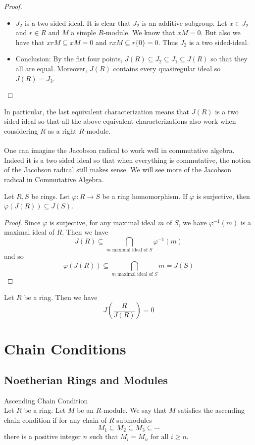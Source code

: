 \documentclass[a4paper]{article}
\begin{document}
\begin{thm}{}{}
\begin{proof}
\begin{itemize}
\item $J_2$ is a two sided ideal. It is clear that $J_2$ is an additive subgroup. Let $x\in J_2$ and $r\in R$ and $M$ a simple $R$-module. We know that $xM=0$. But also we have that $xrM\subseteq xM=0$ and $rxM\subseteq r\{0\}=0$. Thus $J_2$ is a two sided-ideal. 

\item Conclusion: By the fist four points, $J(R)\subseteq J_2\subseteq J_1\subseteq J(R)$ so that they all are equal. Moreover, $J(R)$ contains every quasiregular ideal so $J(R)=J_3$. 
\end{itemize}
\end{proof}
\end{thm}

In particular, the last equivalent characterization means that $J(R)$ is a two sided ideal so that all the above equivalent characterizations also work when considering $R$ as a right $R$-module. \\~\\

One can imagine the Jacobson radical to work well in commutative algebra. Indeed it is a two sided ideal so that when everything is commutative, the notion of the Jacobson radical still makes sense. We will see more of the Jacobson radical in Commutative Algebra. 

\begin{lmm}{}{} Let $R,S$ be rings. Let $\varphi:R\to S$ be a ring homomorphism. If $\varphi$ is surjective, then $\varphi(J(R))\subseteq J(S)$. 
\begin{proof}
Since $\varphi$ is surjective, for any maximal ideal $m$ of $S$, we have $\varphi^{-1}(m)$ is a maximal ideal of $R$. Then we have $$J(R)\subseteq\bigcap_{m\text{ maximal ideal of }S}\varphi^{-1}(m)$$ and so $$\varphi(J(R))\subseteq\bigcap_{m\text{ maximal ideal of }S}m=J(S)$$
\end{proof}
\end{lmm}

\begin{lmm}{}{} Let $R$ be a ring. Then we have $$J\left(\frac{R}{J(R)}\right)=0$$
\end{lmm}

\pagebreak
\section{Chain Conditions}
\subsection{Noetherian Rings and Modules}
\begin{defn}{Ascending Chain Condition}{}\\
Let $R$ be a ring. Let $M$ be an $R$-module. We say that $M$ satisfies the ascending chain condition if for any chain of $R$-submodules $$M_1\subseteq M_2\subseteq M_3\subseteq\cdots$$ there is a positive integer $n$ such that $M_i=M_n$ for all $i\geq n$. 
\end{defn}
\end{document}
